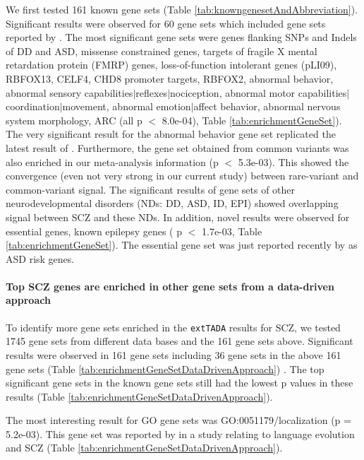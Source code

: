 \documentclass[]{article}
\begin{document}
We first tested 161 known gene sets
(Table \ref{tab:knowngenesetAndAbbreviation}).
Significant results
were observed for 60 gene sets which included gene sets reported by \cite{genovese2016increased}. The most significant gene sets were genes flanking SNPs
and Indels of DD and ASD, missense constrained genes, targets
of fragile X mental retardation protein (FMRP)
genes, loss-of-function intolerant genes (pLI09), RBFOX13, CELF4, CHD8 promoter targets,
RBFOX2, abnormal behavior, abnormal sensory
capabilities$|$reflexes$|$nociception, abnormal motor
capabilities$|$coordination$|$movement, abnormal emotion$|$affect
behavior, abnormal nervous system morphology, ARC (all p $<$ 8.0e-04), Table
\ref{tab:enrichmentGeneSet}). The very significant
result for the abnormal behavior gene set replicated the latest result of
\cite{pardinas2016common}. Furthermore, the gene set obtained from
common variants \citep{pardinas2016common} was also enriched in our
meta-analysis information (p $<$ 5.3e-03). This showed the convergence
(even not very strong in our current study) between
rare-variant and common-variant signal.
The significant results of gene sets of other
neurodevelopmental disorders (NDs: DD, ASD, ID, EPI) showed overlapping
signal between SCZ and these NDs.
In addition, novel results were observed
for essential genes, known epilepsy genes ( p $<$ 1.7e-03, Table
\ref{tab:enrichmentGeneSet}). The essential gene set was just reported
recently by \cite{ji2016increased} as ASD risk genes.


\paragraph{Top SCZ genes are enriched in other gene sets from a
  data-driven approach}

To identify more gene sets enriched in the \texttt{extTADA} results
for SCZ,
we tested 1745 gene sets from different data bases and the 161 gene
sets above. Significant results were observed in 161 gene sets including 36 gene sets in the
 above 161 gene sets (Table \ref{tab:enrichmentGeneSetDataDrivenApproach})
. The top significant gene sets in the known gene sets still had the
lowest p values in these results (Table  \ref{tab:enrichmentGeneSetDataDrivenApproach}).

The most interesting result for GO gene
sets was GO:0051179/localization (p = 5.2e-03). This gene set was reported by
\cite{murphy2016bridging} in a study relating to language
evolution and SCZ (Table \ref{tab:enrichmentGeneSetDataDrivenApproach}).
\end{document}
